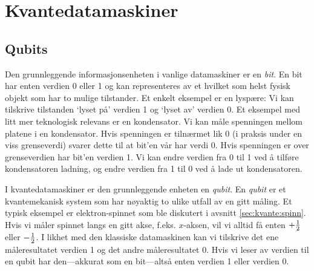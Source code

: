 \chapter{Kvantedatamaskiner}

\section{Qubits}

Den grunnleggende informasjonsenheten i vanlige datamaskiner er en \emph{bit}. En bit har enten verdien 0 eller 1 og kan representeres av et hvilket som helst fysisk objekt som har to mulige tilstander. Et enkelt eksempel er en lyspære: Vi kan tilskrive tilstanden `lyset på' verdien 1 og `lyset av' verdien 0. Et eksempel med litt mer teknologisk relevans er en kondensator. Vi kan måle spenningen mellom platene i en kondensator. Hvis spenningen er tilnærmet lik 0 (i praksis under en viss grenseverdi) svarer dette til at bit'en vår har verdi 0. Hvis spenningen er over grenseverdien har bit'en verdien 1. Vi kan endre verdien fra 0 til 1 ved å tilføre kondensatoren ladning, og endre verdien fra 1 til 0 ved å lade ut kondensatoren.

I kvantedatamaskiner er den grunnleggende enheten en \emph{qubit}. En \emph{qubit} er et kvantemekanisk system som har nøyaktig to ulike utfall av en gitt måling. Et typisk eksempel er elektron-spinnet som ble diskutert i avsnitt \ref{sec:kvante:spinn}. Hvis vi måler spinnet langs en gitt akse, f.eks. $x$-aksen, vil vi alltid få enten $+\frac{1}{2}$ eller $-\frac{1}{2}$. I likhet med den klassiske datamaskinen kan vi tilskrive det ene måleresultatet verdien 1 og det andre måleresultatet 0. Hvis vi leser av verdien til en qubit har den---akkurat som en bit---altså enten verdien 1 eller verdien 0.

